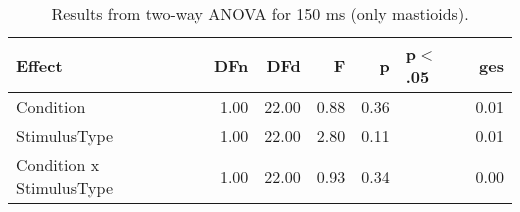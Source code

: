 \begin{table}[ht]
\centering
\begin{tabulary}{\textwidth}{lrrrrlr}
  \toprule
Effect & DFn & DFd & F & p & p$<$.05 & ges \\ 
  \midrule
Condition & 1.00 & 22.00 & 0.88 & 0.36 &  & 0.01 \\ 
  StimulusType & 1.00 & 22.00 & 2.80 & 0.11 &  & 0.01 \\ 
  Condition x StimulusType & 1.00 & 22.00 & 0.93 & 0.34 &  & 0.00 \\ 
   \bottomrule
\end{tabulary}
\caption{Results from two-way ANOVA for 150 ms (only mastioids).} 
\end{table}
